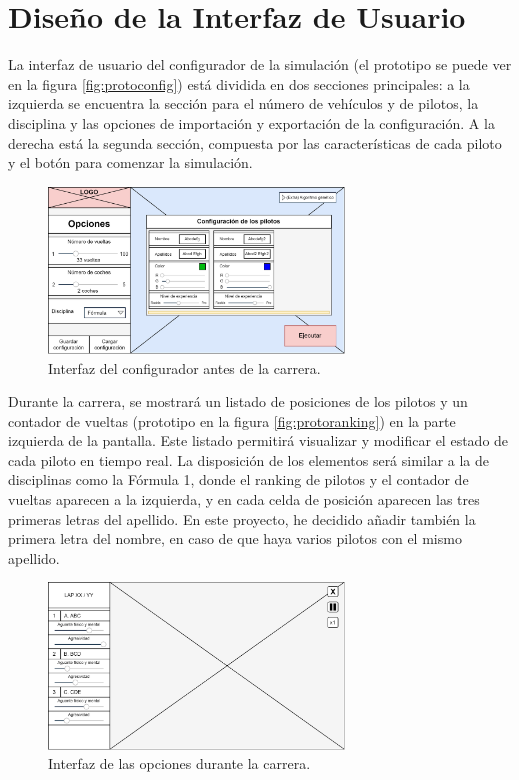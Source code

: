\section{Diseño de la Interfaz de Usuario}

La interfaz de usuario del configurador de la simulación (el prototipo se puede ver en la figura \ref{fig:protoconfig}) está dividida en dos secciones principales: a la izquierda se encuentra la sección para el número de vehículos y de pilotos, la disciplina y las opciones de importación y exportación de la configuración. A la derecha está la segunda sección, compuesta por las características de cada piloto y el botón para comenzar la simulación.

\begin{figure}[H]
    \centering
    \includegraphics[width=0.7\textwidth]{imagenes/pag1.png}
    \caption{Interfaz del configurador antes de la carrera.}
\end{figure}

Durante la carrera, se mostrará un listado de posiciones de los pilotos y un contador de vueltas (prototipo en la figura \ref{fig:protoranking}) en la parte izquierda de la pantalla. Este listado permitirá visualizar y modificar el estado de cada piloto en tiempo real. La disposición de los elementos será similar a la de disciplinas como la Fórmula 1, donde el ranking de pilotos y el contador de vueltas aparecen a la izquierda, y en cada celda de posición aparecen las tres primeras letras del apellido. En este proyecto, he decidido añadir también la primera letra del nombre, en caso de que haya varios pilotos con el mismo apellido.


\begin{figure}[H]
    \centering
    \includegraphics[width=0.7\textwidth]{imagenes/pag2.png}
    \caption{Interfaz de las opciones durante la carrera.}
\end{figure}

